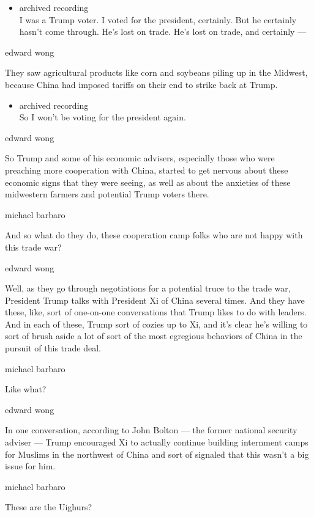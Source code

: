\begin{itemize}
\tightlist
\item
  archived recording\\
  I was a Trump voter. I voted for the president, certainly. But he
  certainly hasn't come through. He's lost on trade. He's lost on trade,
  and certainly ---
\end{itemize}

edward wong

They saw agricultural products like corn and soybeans piling up in the
Midwest, because China had imposed tariffs on their end to strike back
at Trump.

\begin{itemize}
\tightlist
\item
  archived recording\\
  So I won't be voting for the president again.
\end{itemize}

edward wong

So Trump and some of his economic advisers, especially those who were
preaching more cooperation with China, started to get nervous about
these economic signs that they were seeing, as well as about the
anxieties of these midwestern farmers and potential Trump voters there.

michael barbaro

And so what do they do, these cooperation camp folks who are not happy
with this trade war?

edward wong

Well, as they go through negotiations for a potential truce to the trade
war, President Trump talks with President Xi of China several times. And
they have these, like, sort of one-on-one conversations that Trump likes
to do with leaders. And in each of these, Trump sort of cozies up to Xi,
and it's clear he's willing to sort of brush aside a lot of sort of the
most egregious behaviors of China in the pursuit of this trade deal.

michael barbaro

Like what?

edward wong

In one conversation, according to John Bolton --- the former national
security adviser --- Trump encouraged Xi to actually continue building
internment camps for Muslims in the northwest of China and sort of
signaled that this wasn't a big issue for him.

michael barbaro

These are the Uighurs?

